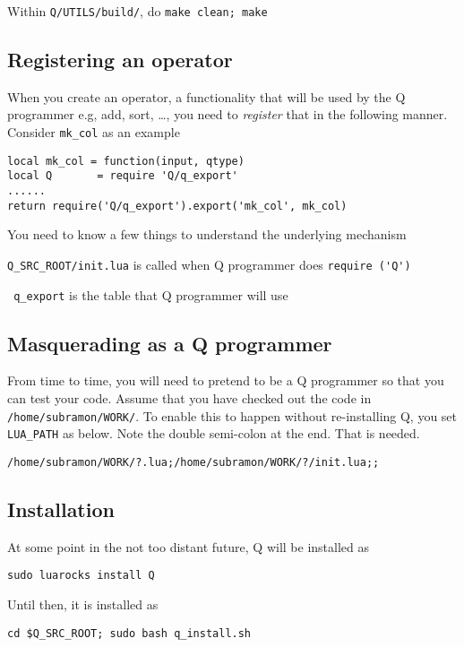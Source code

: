 \item Within \verb+Q/UTILS/build/+, do {\tt make clean; make} 
\ee

\subsection{Registering an operator}

When you create an operator, a functionality that will be used by the Q
programmer e.g, add, sort, \ldots, you need to {\em register} that in the
following manner. Consider \verb+mk_col+ as an example

\begin{verbatim}
local mk_col = function(input, qtype)
local Q       = require 'Q/q_export'
......
return require('Q/q_export').export('mk_col', mk_col)
\end{verbatim}

You need to know a few things to understand the underlying mechanism
\be
\item 
\verb+Q_SRC_ROOT/init.lua+ is called when Q programmer does 
\verb+require ('Q')+
\item \verb+ q_export+ is the table that Q programmer will use
\ee



\subsection{Masquerading as a Q programmer}
\label{masquerade}

From time to time, you will need to pretend to be a Q programmer so that you can
test your code. Assume that you have checked out the code in 
\verb+/home/subramon/WORK/+. 
To enable this to happen without re-installing Q, you set
\verb+LUA_PATH+ as below. Note the double semi-colon at the end. That is needed.
\begin{verbatim}
/home/subramon/WORK/?.lua;/home/subramon/WORK/?/init.lua;;
\end{verbatim}

\subsection{Installation}

At some point in the not too distant future, Q will be installed as 
\begin{verbatim}
sudo luarocks install Q
\end{verbatim}
Until then, it is installed as 
\begin{verbatim}
cd $Q_SRC_ROOT; sudo bash q_install.sh 
\end{verbatim}
